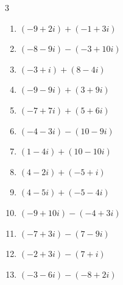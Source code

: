 \begin{multicols}{3}
\begin{enumerate}
        \phantom{$\displaystyle =-10+3i$}

  \item $\displaystyle (-9+2i) + (-1+3i)$

        \phantom{$\displaystyle =-10+5i$}

  \item $\displaystyle (-8-9i) - (-3+10i)$

        \phantom{$\displaystyle =-5-19i$}

  \item $\displaystyle (-3+i) + (8-4i)$

        \phantom{$\displaystyle =5-3i$}

  \item $\displaystyle (-9-9i) + (3+9i)$

        \phantom{$\displaystyle =-6$}

  \item $\displaystyle (-7+7i) + (5+6i)$

        \phantom{$\displaystyle =-2+13i$}

  \item $\displaystyle (-4-3i) - (10-9i)$

        \phantom{$\displaystyle =-14+6i$}

  \item $\displaystyle (1-4i) + (10-10i)$

        \phantom{$\displaystyle =11-14i$}

  \item $\displaystyle (4-2i) + (-5+i)$

        \phantom{$\displaystyle =-1-i$}

  \item $\displaystyle (4-5i) + (-5-4i)$

        \phantom{$\displaystyle =-1-9i$}

  \item $\displaystyle (-9+10i) - (-4+3i)$

        \phantom{$\displaystyle =-5+7i$}

  \item $\displaystyle (-7+3i) - (7-9i)$

        \phantom{$\displaystyle =-14+12i$}

  \item $\displaystyle (-2+3i) - (7+i)$

        \phantom{$\displaystyle =-9+2i$}

  \item $\displaystyle (-3-6i) - (-8+2i)$


\end{enumerate}
\end{multicols}

